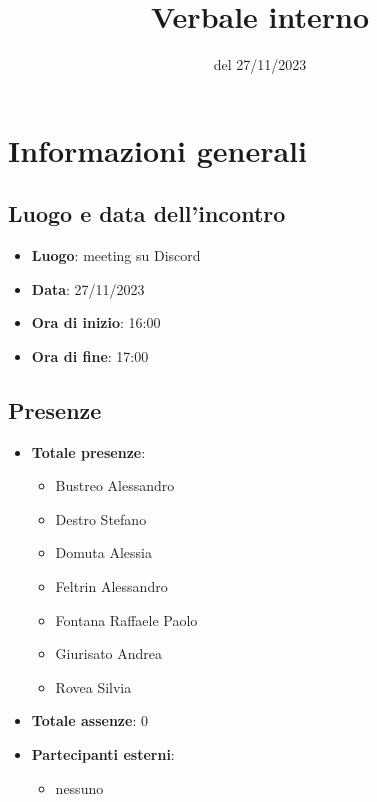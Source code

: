 \documentclass[12pt]{article}
\title{Verbale interno}
\date{del 27/11/2023}
\begin{document}
	\makefirstpage
	
	
	\clearpage
	
	\tableofcontents
	\clearpage

    \section{Informazioni generali}
	
	\subsection{Luogo e data dell'incontro}
	
    	\begin{itemize}
    		\item \textbf{Luogo}: meeting su Discord
    		\item \textbf{Data}: 27/11/2023
    		\item \textbf{Ora di inizio}: 16:00
    		\item \textbf{Ora di fine}: 17:00
    	\end{itemize}
	
	\subsection{Presenze}
	
    	\begin{itemize}
    		\item \textbf{Totale presenze}:
    		\begin{itemize}
    			\item Bustreo Alessandro
    			\item Destro Stefano
    			\item Domuta Alessia 
    			\item Feltrin Alessandro 
    			\item Fontana Raffaele Paolo 
    			\item Giurisato Andrea 
    			\item Rovea Silvia
    		\end{itemize}
    		
    		\item \textbf{Totale assenze}: 0
    		
    		\item \textbf{Partecipanti esterni}:
    		\begin{itemize}
    			\item nessuno
    		\end{itemize}
    	\end{itemize}
\end{document}
